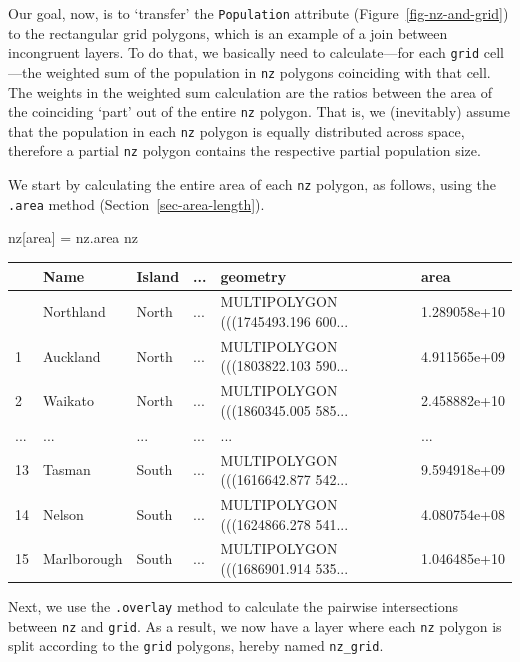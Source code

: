 \documentclass[
  letterpaper,
]{krantz}
\newenvironment{Shaded}{\begin{snugshade}}{\end{snugshade}}
\newcommand{\NormalTok}[1]{\textcolor[rgb]{0.00,0.23,0.31}{#1}}
\newcommand{\OperatorTok}[1]{\textcolor[rgb]{0.37,0.37,0.37}{#1}}
\newcommand{\StringTok}[1]{\textcolor[rgb]{0.13,0.47,0.30}{#1}}
\begin{document}
Our goal, now, is to `transfer' the
\texttt{\textquotesingle{}Population\textquotesingle{}} attribute
(Figure~\ref{fig-nz-and-grid}) to the rectangular grid polygons, which
is an example of a join between incongruent layers. To do that, we
basically need to calculate---for each \texttt{grid} cell---the weighted
sum of the population in \texttt{nz} polygons coinciding with that cell.
The weights in the weighted sum calculation are the ratios between the
area of the coinciding `part' out of the entire \texttt{nz} polygon.
That is, we (inevitably) assume that the population in each \texttt{nz}
polygon is equally distributed across space, therefore a partial
\texttt{nz} polygon contains the respective partial population size.

We start by calculating the entire area of each \texttt{nz} polygon, as
follows, using the \texttt{.area} method
(Section~\ref{sec-area-length}).

\begin{Shaded}
\begin{Highlighting}[]
\NormalTok{nz[}\StringTok{\textquotesingle{}area\textquotesingle{}}\NormalTok{] }\OperatorTok{=}\NormalTok{ nz.area}
\NormalTok{nz}
\end{Highlighting}
\end{Shaded}

\begin{longtable}[]{@{}llllll@{}}
\toprule\noalign{}
& Name & Island & ... & geometry & area \\
\midrule\noalign{}
\endhead
\bottomrule\noalign{}
\endlastfoot
0 & Northland & North & ... & MULTIPOLYGON (((1745493.196 600... &
1.289058e+10 \\
1 & Auckland & North & ... & MULTIPOLYGON (((1803822.103 590... &
4.911565e+09 \\
2 & Waikato & North & ... & MULTIPOLYGON (((1860345.005 585... &
2.458882e+10 \\
... & ... & ... & ... & ... & ... \\
13 & Tasman & South & ... & MULTIPOLYGON (((1616642.877 542... &
9.594918e+09 \\
14 & Nelson & South & ... & MULTIPOLYGON (((1624866.278 541... &
4.080754e+08 \\
15 & Marlborough & South & ... & MULTIPOLYGON (((1686901.914 535... &
1.046485e+10 \\
\end{longtable}

Next, we use the \texttt{.overlay} method to calculate the pairwise
intersections between \texttt{nz} and \texttt{grid}. As a result, we now
have a layer where each \texttt{nz} polygon is split according to the
\texttt{grid} polygons, hereby named \texttt{nz\_grid}.
\end{document}
